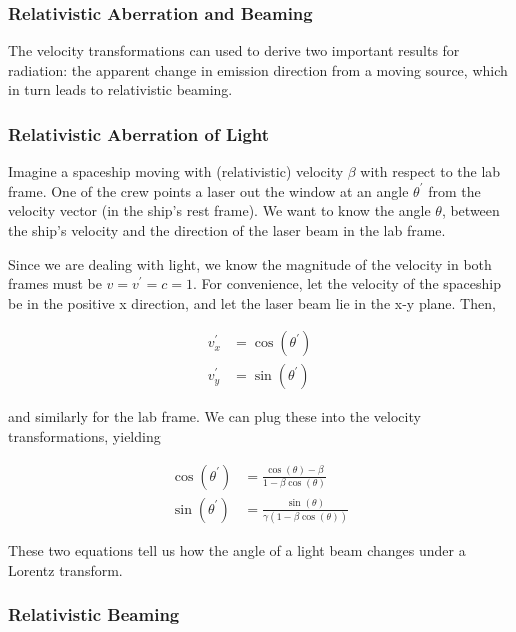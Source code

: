 \documentclass{article}
\begin{document}
\subsubsection*{Relativistic Aberration and Beaming}

The velocity transformations can used to derive two important results for radiation: the apparent change in emission direction from a moving source, which in turn leads to relativistic beaming.  

\subsubsection*{Relativistic Aberration of Light}

Imagine a spaceship moving with (relativistic) velocity $\beta$ with respect to the lab frame.  One of the crew points a laser out the window at an angle $\theta^\prime$ from the velocity vector (in the ship's rest frame).  We want to know the angle $\theta$, between the ship's velocity and the direction of the laser beam in the lab frame.

Since we are dealing with light, we know the magnitude of the velocity in both frames must be $v = v^\prime = c = 1$.  For convenience, let the velocity of the spaceship be in the positive x direction, and let the laser beam lie in the x-y plane.  Then,

\begin{align}
  v^\prime_x &= \cos\left(\theta^\prime\right) 
  \\
  v^\prime_y &= \sin\left(\theta^\prime\right)
\end{align}

and similarly for the lab frame.  We can plug these into the velocity transformations, yielding

\begin{align}
  \cos\left(\theta^\prime\right) &= \frac{\cos\left(\theta\right) - \beta}{1 - \beta \cos\left(\theta\right)}
  \\
  \sin\left(\theta^\prime\right) &= \frac{\sin\left(\theta\right)}{\gamma \left(1 - \beta \cos\left(\theta\right)\right)}
\end{align}

These two equations tell us how the angle of a light beam changes under a Lorentz transform.

\subsubsection*{Relativistic Beaming}
\end{document}
